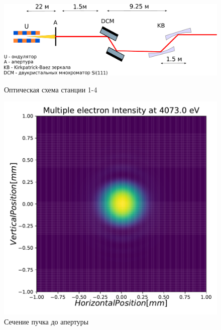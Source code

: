 \begin{figure}[h]
	\begin{minipage}{0.99\textwidth}
	\centering  
	\includegraphics[width=\textwidth]{pic/OptScheme_1-4.pdf}
	\caption{Оптическая схема станции 1-4}
	\label{fig:OptScheme_1-4}  
	\end{minipage}\hfill

	\begin{minipage}{0.3\textwidth}
		\centering
		\includegraphics[width=\textwidth]{pic/3_harm_before_optics_2d.pdf}
		\caption{Сечение пучка до апертуры}
		\label{fig:3_harm_before_optics_2d}
	\end{minipage}
	\begin{minipage}{0.3\textwidth}
		\centering

\end{minipage}
\end{figure}
